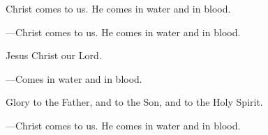 \responsory

\begin{hangpar}
Christ comes to us. He comes in water and in blood.

{\color{red}---\thinspace }Christ comes to us. He comes in water and in blood.

\medskip Jesus Christ our Lord.

{\color{red}---\thinspace }Comes in water and in blood.

\medskip Glory to the Father, and to the Son, and to the Holy Spirit.

{\color{red}---\thinspace }Christ comes to us. He comes in water and in blood.
\end{hangpar}